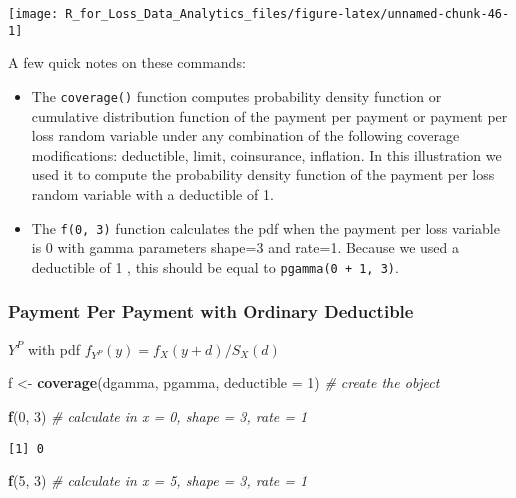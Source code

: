 \documentclass[]{book}
\newenvironment{Shaded}{\begin{snugshade}}{\end{snugshade}}
\newcommand{\KeywordTok}[1]{\textcolor[rgb]{0.13,0.29,0.53}{\textbf{#1}}}
\newcommand{\DataTypeTok}[1]{\textcolor[rgb]{0.13,0.29,0.53}{#1}}
\newcommand{\DecValTok}[1]{\textcolor[rgb]{0.00,0.00,0.81}{#1}}
\newcommand{\StringTok}[1]{\textcolor[rgb]{0.31,0.60,0.02}{#1}}
\newcommand{\CommentTok}[1]{\textcolor[rgb]{0.56,0.35,0.01}{\textit{#1}}}
\newcommand{\NormalTok}[1]{#1}
\providecommand{\tightlist}{%
  \setlength{\itemsep}{0pt}\setlength{\parskip}{0pt}}
\theoremstyle{definition}
\theoremstyle{definition}
\theoremstyle{definition}
\theoremstyle{remark}
\begin{document}
\begin{center}\texttt{[image: R\_for\_Loss\_Data\_Analytics\_files/figure-latex/unnamed-chunk-46-1]} \end{center}

A few quick notes on these commands:

\begin{itemize}
\tightlist
\item
  The \texttt{coverage()} function computes probability density function
  or cumulative distribution function of the payment per payment or
  payment per loss random variable under any combination of the
  following coverage modifications: deductible, limit, coinsurance,
  inflation. In this illustration we used it to compute the probability
  density function of the payment per loss random variable with a
  deductible of 1.
\item
  The \texttt{f(0,\ 3)} function calculates the pdf when the payment per
  loss variable is 0 with gamma parameters shape=3 and rate=1. Because
  we used a deductible of 1 , this should be equal to
  \texttt{pgamma(0\ +\ 1,\ 3)}.
\end{itemize}

\subsubsection{Payment Per Payment with Ordinary
Deductible}\label{payment-per-payment-with-ordinary-deductible}

\(Y^P\) with pdf \(f_{Y^P}(y) = f_X(y+d)/S_X(d)\)

\begin{Shaded}
\begin{Highlighting}[]
\NormalTok{f <-}\StringTok{ }\KeywordTok{coverage}\NormalTok{(dgamma, pgamma, }\DataTypeTok{deductible =} \DecValTok{1}\NormalTok{)  }\CommentTok{# create the object}

\KeywordTok{f}\NormalTok{(}\DecValTok{0}\NormalTok{, }\DecValTok{3}\NormalTok{)  }\CommentTok{# calculate in x = 0, shape = 3, rate = 1}
\end{Highlighting}
\end{Shaded}

\begin{verbatim}
[1] 0
\end{verbatim}

\begin{Shaded}
\begin{Highlighting}[]
\KeywordTok{f}\NormalTok{(}\DecValTok{5}\NormalTok{, }\DecValTok{3}\NormalTok{)  }\CommentTok{# calculate in x = 5, shape = 3, rate = 1}
\end{Highlighting}
\end{Shaded}
\end{document}

